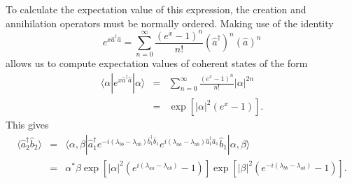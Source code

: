\documentclass{iopart}
\begin{document}
To calculate the expectation value of this expression, the creation and annihilation operators must be normally ordered. Making use of the identity \cite{louisell}
\begin{equation}
e^{x \hat{a}^{\dagger} \hat{a}} = \sum_{n=0}^{\infty} \frac{(e^x - 1)^n} {n!} (\hat{a}^{\dagger})^n (\hat{a})^n
\end{equation}
allows us to compute expectation values of coherent states of the form
\begin{eqnarray}
\langle \alpha | e^{x \hat{a}^{\dagger} \hat{a}} |\alpha \rangle &=& \sum_{n=0}^{\infty} \frac{(e^x - 1)^n} {n!} |\alpha|^{2n} \nonumber \\
%
&=& \exp[|\alpha|^2(e^x -1)]. \label{eqExpectationValueOfExponential}
\end{eqnarray}
This gives
\begin{eqnarray}
\langle \hat{a}^{\dagger}_2 \hat{b}_2 \rangle &=& \langle \alpha, \beta | \hat{a}^{\dagger}_1 e^{-i (\lambda_{bb} - \lambda_{ab}) \hat{b}^{\dagger}_1 \hat{b}_1} e^{i (\lambda_{aa} - \lambda_{ab}) \hat{a}^{\dagger}_1 \hat{a}_1} \hat{b}_1 | \alpha, \beta \rangle \nonumber \\
%
&=& \alpha^* \beta \exp[|\alpha|^2(e^{i (\lambda_{aa} - \lambda_{ab})} -1)] \exp[|\beta|^2 (e^{-i (\lambda_{bb} - \lambda_{ab})} -1)].
\end{eqnarray}
\end{document}
